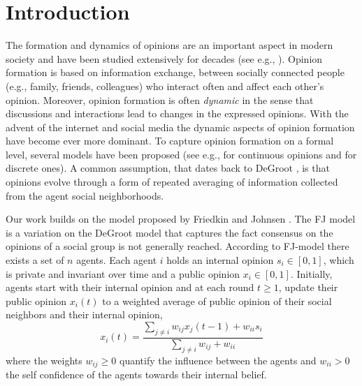 \section{Introduction}
The formation and dynamics of opinions are an important aspect in modern
society and have been studied extensively for decades (see e.g., \cite{Jackson}).
Opinion formation is based on information exchange, between socially
connected people (e.g., family, friends, colleagues) who interact often
and affect each other's opinion. Moreover, opinion
formation is often \emph{dynamic} in the sense that discussions and
interactions lead to changes in the expressed opinions. With the
advent of the internet and social media the dynamic aspects of
opinion formation have become ever more dominant. To capture opinion formation
on a formal level, several models have been proposed
(see e.g., \cite{DeGroot,FJ90,HK,BKO11} for
continuous opinions and \cite{FGV12,YOASS13,BFM16} for discrete ones).
A common assumption, that dates back to DeGroot \cite{DeGroot}, is
that opinions evolve through a form of repeated averaging of
information collected from the agent social neighborhoods.

Our work builds on the model
proposed by Friedkin and Johnsen \cite{FJ90}.
The FJ model is a variation on the DeGroot model
that captures the fact consensus on the opinions
of a social group is not generally reached.
According to FJ-model there exists a set of $n$ agents.
Each agent $i$ holds an internal opinion $s_i\in [0,1]$, which is private and
invariant over time and a public opinion $x_i \in [0,1]$.
Initially, agents start with their internal opinion and at
each round $t\geq1$, update their public opinion
$x_i(t)$ to a weighted average of public opinion of
their social neighbors and their internal opinion,
%
\begin{equation}\label{eq:FJ_model}
  x_i(t)= \frac{\sum_{j\neq i}w_{ij}x_j(t-1)
    + w_{ii}s_i}{\sum_{j\neq i}w_{ij}+w_{ii}}
\end{equation}
%
where the weights $w_{ij}\geq 0$ quantify the influence between
the agents and $w_{ii}>0$ the self confidence of the agents
towards their internal belief.

